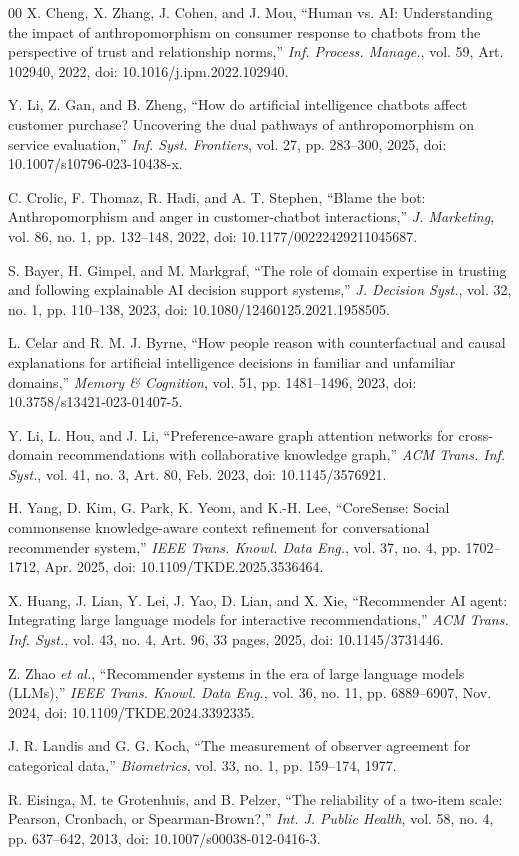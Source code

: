\documentclass[conference]{IEEEtran}
\begin{document}
\begin{thebibliography}{00}
X. Cheng, X. Zhang, J. Cohen, and J. Mou, ``Human vs. AI: Understanding the impact
of anthropomorphism on consumer response to chatbots from the perspective of trust
and relationship norms,'' \textit{Inf. Process. Manage.}, vol. 59, Art. 102940,
2022, doi: 10.1016/j.ipm.2022.102940.

Y. Li, Z. Gan, and B. Zheng, ``How do artificial intelligence chatbots affect
customer purchase? Uncovering the dual pathways of anthropomorphism on service
evaluation,'' \textit{Inf. Syst. Frontiers}, vol. 27, pp. 283--300, 2025,
doi: 10.1007/s10796-023-10438-x.

C. Crolic, F. Thomaz, R. Hadi, and A. T. Stephen, ``Blame the bot: Anthropomorphism
and anger in customer-chatbot interactions,'' \textit{J. Marketing}, vol. 86, no. 1,
pp. 132--148, 2022, doi: 10.1177/00222429211045687.

S. Bayer, H. Gimpel, and M. Markgraf, ``The role of domain expertise in trusting and
following explainable AI decision support systems,'' \textit{J. Decision Syst.},
vol. 32, no. 1, pp. 110--138, 2023, doi: 10.1080/12460125.2021.1958505.

L. Celar and R. M. J. Byrne, ``How people reason with counterfactual and causal
explanations for artificial intelligence decisions in familiar and unfamiliar
domains,'' \textit{Memory \& Cognition}, vol. 51, pp. 1481--1496, 2023,
doi: 10.3758/s13421-023-01407-5.

Y. Li, L. Hou, and J. Li, ``Preference-aware graph attention networks for
cross-domain recommendations with collaborative knowledge graph,'' \textit{ACM Trans.
Inf. Syst.}, vol. 41, no. 3, Art. 80, Feb. 2023, doi: 10.1145/3576921.

H. Yang, D. Kim, G. Park, K. Yeom, and K.-H. Lee, ``CoreSense: Social commonsense
knowledge-aware context refinement for conversational recommender system,''
\textit{IEEE Trans. Knowl. Data Eng.}, vol. 37, no. 4, pp. 1702--1712, Apr. 2025,
doi: 10.1109/TKDE.2025.3536464.

X. Huang, J. Lian, Y. Lei, J. Yao, D. Lian, and X. Xie, ``Recommender AI agent:
Integrating large language models for interactive recommendations,'' \textit{ACM Trans.
Inf. Syst.}, vol. 43, no. 4, Art. 96, 33 pages, 2025, doi: 10.1145/3731446.

Z. Zhao \textit{et al.}, ``Recommender systems in the era of large language models
(LLMs),'' \textit{IEEE Trans. Knowl. Data Eng.}, vol. 36, no. 11, pp. 6889--6907,
Nov. 2024, doi: 10.1109/TKDE.2024.3392335.

J. R. Landis and G. G. Koch, ``The measurement of observer agreement for categorical
data,'' \textit{Biometrics}, vol. 33, no. 1, pp. 159--174, 1977.

R. Eisinga, M. te Grotenhuis, and B. Pelzer, ``The reliability of a two-item scale:
Pearson, Cronbach, or Spearman-Brown?,'' \textit{Int. J. Public Health}, vol. 58,
no. 4, pp. 637--642, 2013, doi: 10.1007/s00038-012-0416-3.

\end{thebibliography}
\end{document}
